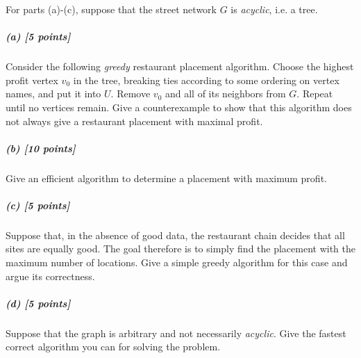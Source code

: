 \documentclass[11pt]{article}
\begin{document}
For parts (a)-(c), suppose that the street network $G$ is {\em acyclic}, i.e. a tree.

\subparagraph{(a) [5 points]}
Consider the following {\em greedy} restaurant placement algorithm. Choose the highest profit vertex $v_0$ in the
tree, breaking ties according to some ordering on vertex names, and put it into $U$. Remove $v_0$ and all of its
neighbors from $G$. Repeat until no vertices remain. Give a counterexample to show that this algorithm does not
always give a restaurant placement with maximal profit.


\subparagraph{(b) [10 points]}
Give an efficient algorithm to determine a placement with maximum profit.


\subparagraph{(c) [5 points]}
Suppose that, in the absence of good data, the restaurant chain decides that all sites are equally good. The goal
therefore is to simply find the placement with the maximum number of locations. Give a simple greedy algorithm for
this case and argue its correctness.


\subparagraph{(d) [5 points]}
Suppose that the graph is arbitrary and not necessarily {\em acyclic}. Give the fastest correct algorithm you can
for solving the problem.

\end{document}
